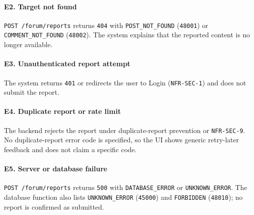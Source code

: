 \documentclass[12pt]{article}
\begin{document}
\hypertarget{sec:e2-target-not-found}{}
\paragraph*{E2. Target not found}
\par\medskip

\texttt{POST /forum/reports} returns \texttt{404} with \texttt{POST\_NOT\_FOUND} (\texttt{48001}) or \texttt{COMMENT\_NOT\_FOUND} (\texttt{48002}). The system explains that the reported content is no longer available.
\par\medskip

\hypertarget{sec:e3-unauthenticated-report-attempt}{}
\paragraph*{E3. Unauthenticated report attempt}
\par\medskip

The system returns \texttt{401} or redirects the user to Login (\texttt{NFR-SEC-1}) and does not submit the report.
\par\medskip

\hypertarget{sec:e4-duplicate-report-or-rate-limit}{}
\paragraph*{E4. Duplicate report or rate limit}
\par\medskip

The backend rejects the report under duplicate-report prevention or \texttt{NFR-SEC-9}. No duplicate-report error code is specified, so the UI shows generic retry-later feedback and does not claim a specific code.
\par\medskip

\hypertarget{sec:e5-server-or-database-failure}{}
\paragraph*{E5. Server or database failure}
\par\medskip

\texttt{POST /forum/reports} returns \texttt{500} with \texttt{DATABASE\_ERROR} or \texttt{UNKNOWN\_ERROR}. The database function also lists \texttt{UNKNOWN\_ERROR} (\texttt{45000}) and \texttt{FORBIDDEN} (\texttt{48010}); no report is confirmed as submitted.
\par\medskip

\hypertarget{sec:b7-business-rules}{}
\end{document}
